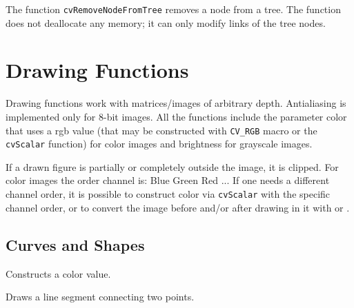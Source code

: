 \fi

The function \texttt{cvRemoveNodeFromTree} removes a node from a tree. The function does not deallocate any memory; it can only modify links of the tree nodes.

\section{Drawing Functions}

Drawing functions work with matrices/images of arbitrary depth.
Antialiasing is implemented only for 8-bit images. All the functions
include the parameter color that uses a rgb value (that may be constructed
with \texttt{CV\_RGB} macro or the \texttt{cvScalar} function) for color
images and brightness for grayscale images.

If a drawn figure is partially or completely outside the image, it
is clipped. For color images the order channel is: Blue Green Red
... If one needs a different channel order, it is possible to
construct color via \texttt{cvScalar} with the specific channel
order, or to convert the image before and/or after drawing in it with
 or .

\subsection{Curves and Shapes}

\label{CV_RGB}

Constructs a color value.


\label{Line}

Draws a line segment connecting two points.


\begin{description}
\end{description}

